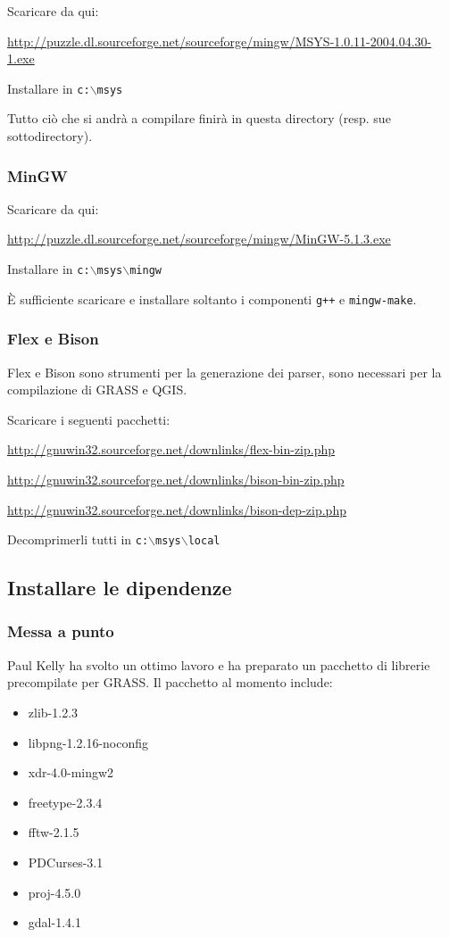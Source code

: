 Scaricare da qui:

\url{http://puzzle.dl.sourceforge.net/sourceforge/mingw/MSYS-1.0.11-2004.04.30-1.exe}

Installare in \texttt{c:$\backslash$msys}

Tutto ciò che si andrà a compilare finirà in questa directory (resp. sue sottodirectory).

\subsubsection{MinGW}
Scaricare da qui:

\url{http://puzzle.dl.sourceforge.net/sourceforge/mingw/MinGW-5.1.3.exe}

Installare in \texttt{c:$\backslash$msys$\backslash$mingw}

È sufficiente scaricare e installare soltanto i componenti \texttt{g++} e \texttt{mingw-make}.

\subsubsection{Flex e Bison}
Flex e Bison sono strumenti per la generazione dei parser, sono necessari per la compilazione di GRASS e QGIS.

Scaricare i seguenti pacchetti:

\url{http://gnuwin32.sourceforge.net/downlinks/flex-bin-zip.php}

\url{http://gnuwin32.sourceforge.net/downlinks/bison-bin-zip.php}

\url{http://gnuwin32.sourceforge.net/downlinks/bison-dep-zip.php}

Decomprimerli tutti in \texttt{c:$\backslash$msys$\backslash$local}

\subsection{Installare le dipendenze}
\subsubsection{Messa a punto}
Paul Kelly ha svolto un ottimo lavoro e ha preparato un pacchetto di librerie precompilate per GRASS.
Il pacchetto al momento include:

\begin{itemize}
\item zlib-1.2.3
\item libpng-1.2.16-noconfig
\item xdr-4.0-mingw2
\item freetype-2.3.4
\item fftw-2.1.5
\item PDCurses-3.1
\item proj-4.5.0
\item gdal-1.4.1
\end{itemize}

